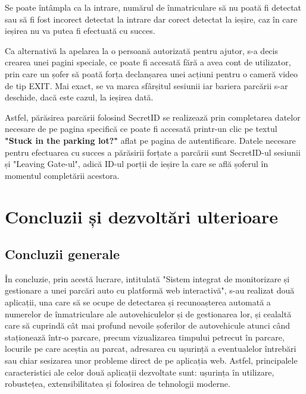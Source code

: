 \documentclass[12pt]{article}
\begin{document}
Se poate \^{i}nt\^{a}mpla ca la intrare, num\u{a}rul de \^{i}nmatriculare s\u{a} nu poat\u{a} fi detectat sau s\u{a} fi fost incorect detectat la intrare dar corect detectat la ieșire, caz \^{i}n care ieșirea nu va putea fi efectuat\u{a} cu succes.

Ca alternativ\u{a} la apelarea la o persoan\u{a} autorizat\u{a} pentru ajutor, s-a decis crearea unei pagini speciale, ce poate fi accesat\u{a} f\u{a}r\u{a} a avea cont de utilizator, prin care un șofer s\u{a} poat\u{a} forța declanșarea unei acțiuni pentru o camer\u{a} video de tip EXIT. Mai exact, se va marca sf\^{a}rșitul sesiunii iar bariera parc\u{a}rii s-ar deschide, dac\u{a} este cazul, la ieșirea dat\u{a}.

Astfel, p\u{a}r\u{a}sirea parc\u{a}rii folosind SecretID se realizeaz\u{a} prin completarea datelor necesare de pe pagina specific\u{a} ce poate fi accesat\u{a} printr-un clic pe textul \textbf{"Stuck in the parking lot?"} aflat pe pagina de autentificare. Datele necesare pentru efectuarea cu succes a p\u{a}r\u{a}sirii forțate a parc\u{a}rii sunt SecretID-ul sesiunii și "Leaving Gate-ul", adic\u{a} ID-ul porții de ieșire la care se afl\u{a} șoferul \^{i}n momentul complet\u{a}rii acestora.

\newpage

\section{Concluzii și dezvoltări ulterioare}

\subsection{Concluzii generale}

\^{I}n concluzie, prin acest\u{a} lucrare, intitulat\u{a} "Sistem integrat de monitorizare și gestionare a unei parc\u{a}ri auto cu platform\u{a} web interactiv\u{a}", s-au realizat dou\u{a} aplicații, una care s\u{a} se ocupe de detectarea și recunoașterea automat\u{a} a numerelor de \^{i}nmatriculare ale autovehiculelor și de gestionarea lor, și cealalt\u{a} care s\u{a} cuprind\u{a} c\^{a}t mai profund nevoile șoferilor de autovehicule atunci c\^{a}nd staționeaz\u{a} \^{i}ntr-o parcare, precum vizualizarea timpului petrecut \^{i}n parcare, locurile pe care aceștia au parcat, adresarea cu ușurinț\u{a} a eventualelor \^{i}ntreb\u{a}ri sau chiar sesizarea unor probleme direct de pe aplicația web. Astfel, principalele caracteristici ale celor dou\u{a} aplicații dezvoltate sunt: ușurința \^{i}n utilizare, robustețea, extensibilitatea și folosirea de tehnologii moderne. 
\end{document}
